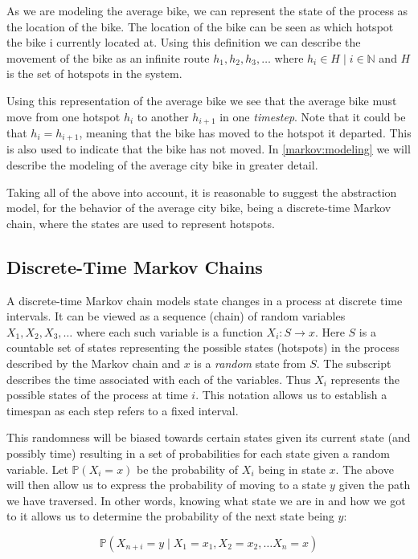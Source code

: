 As we are modeling the average bike, we can represent the state of the process as the location of the bike.
The location of the bike can be seen as which hotspot the bike i currently located at.
Using this definition we can describe the movement of the bike as an infinite route $h_1, h_2, h_3, \dots$ where $h_i \in H \mid i \in \mathbb{N}$ and $H$ is the set of hotspots in the system.

Using this representation of the average bike we see that the average bike must move from one hotspot $h_i$ to another $h_{i+1}$ in one \textit{timestep}.
Note that it could be that $h_i = h_{i+1}$, meaning that the bike has moved to the hotspot it departed.
This is also used to indicate that the bike has not moved.
In \cref{markov:modeling} we will describe the modeling of the average city bike in greater detail.

Taking all of the above into account, it is reasonable to suggest the abstraction model, for the behavior of the average city bike, being a discrete-time Markov chain, where the states are used to represent hotspots.

\subsection{Discrete-Time Markov Chains}\label{markov}
A discrete-time Markov chain models state changes in a process at discrete time intervals.
It can be viewed as a sequence (chain) of random variables $X_1, X_2, X_3, \dots$ where each such variable is a function $X_i:S \rightarrow x$.
Here $S$ is a countable set of states representing the possible states (hotspots) in the process described by the Markov chain and $x$ is a \textit{random} state from $S$.
The subscript describes the time associated with each of the variables.
Thus $X_i$ represents the possible states of the process at time $i$.
This notation allows us to establish a timespan as each step refers to a fixed interval.

This randomness will be biased towards certain states given its current state (and possibly time) resulting in a set of probabilities for each state given a random variable.
Let $\mathbb{P}(X_i = x)$ be the probability of $X_i$ being in state $x$.
The above will then allow us to express the probability of moving to a state $y$ given the path we have traversed.
In other words, knowing what state we are in and how we got to it allows us to determine the probability of the next state being $y$:

$$\mathbb{P}(X_{n+i} = y \mid X_1 = x_1, X_2 = x_2, \dots X_n = x)$$

